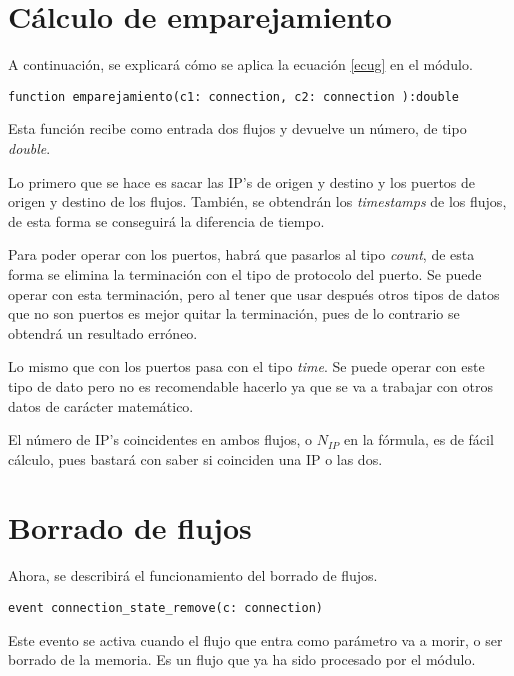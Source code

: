 \section{Cálculo de emparejamiento}

A continuación, se explicará cómo se aplica la ecuación \ref{ecug} en el módulo.

\begin{lstlisting}[style=CodigoC]
function emparejamiento(c1: connection, c2: connection ):double 
\end{lstlisting}

\intro Esta función recibe como entrada dos flujos y devuelve un número, de tipo \textit{double}. 

\intro Lo primero que se hace es sacar las IP's de origen y destino y los puertos de origen y destino de los flujos. También, se 
obtendrán los \textit{timestamps} de los flujos, de esta forma se conseguirá la diferencia de tiempo. 

\intro Para poder operar con los puertos, habrá que pasarlos al tipo \textit{count}, de esta forma se elimina la 
terminación con el tipo de protocolo del puerto. Se puede operar con esta terminación, pero al tener que usar después otros tipos de 
datos que no son puertos es mejor quitar la terminación, pues de lo contrario se obtendrá un resultado erróneo. 

\intro Lo mismo que con los puertos pasa con el tipo \textit{time}. Se puede operar con este tipo de dato pero no es recomendable 
hacerlo ya que se va a trabajar con otros datos de carácter matemático.

\intro El número de IP's coincidentes en ambos flujos, o \textit{$N_{IP}$} en la fórmula, es de fácil cálculo, pues bastará con saber 
si coinciden una IP o las dos.

\section{Borrado de flujos}

Ahora, se describirá el funcionamiento del borrado de flujos.

\begin{lstlisting}[style=CodigoC]
event connection_state_remove(c: connection)

\end{lstlisting}

\intro Este evento se activa cuando el flujo que entra como parámetro va a morir, o ser borrado de la memoria. Es un flujo 
que ya ha sido procesado por el módulo.

